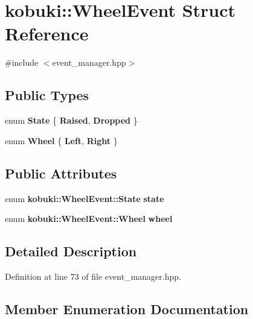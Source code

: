 \section{kobuki\-:\-:\-Wheel\-Event \-Struct \-Reference}
\label{structkobuki_1_1WheelEvent}


{\ttfamily \#include $<$event\-\_\-manager.\-hpp$>$}

\subsection*{\-Public \-Types}
\begin{DoxyCompactItemize}
\item 
enum {\bf \-State} \{ {\bf \-Raised}, 
{\bf \-Dropped}
 \}
\item 
enum {\bf \-Wheel} \{ {\bf \-Left}, 
{\bf \-Right}
 \}
\end{DoxyCompactItemize}
\subsection*{\-Public \-Attributes}
\begin{DoxyCompactItemize}
\item 
enum {\bf kobuki\-::\-Wheel\-Event\-::\-State} {\bf state}
\item 
enum {\bf kobuki\-::\-Wheel\-Event\-::\-Wheel} {\bf wheel}
\end{DoxyCompactItemize}


\subsection{\-Detailed \-Description}


\-Definition at line 73 of file event\-\_\-manager.\-hpp.



\subsection{\-Member \-Enumeration \-Documentation}

